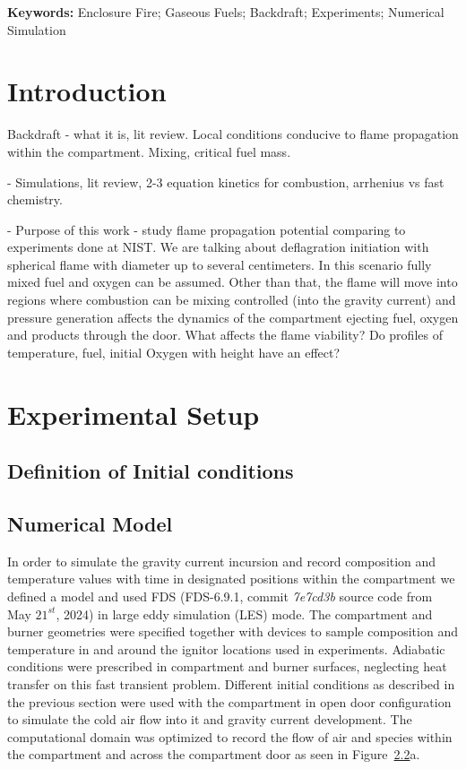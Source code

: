 \documentclass[12pt,letterpaper]{article}
\begin{document}
\begin{flushleft}
\textbf{Keywords:}
Enclosure Fire; Gaseous Fuels; Backdraft; Experiments; Numerical Simulation

\section{Introduction} \addvspace{10pt}
\label{sec:introduction}

Backdraft - what it is, lit review. Local conditions conducive to flame propagation within the compartment. Mixing, critical fuel mass.

- Simulations, lit review, 2-3 equation kinetics for combustion, arrhenius vs fast chemistry.

- Purpose of this work - study flame propagation potential comparing to experiments done at NIST. We are talking about deflagration initiation with spherical flame with diameter up to several centimeters. In this scenario fully mixed fuel and oxygen can be assumed. Other than that, the flame will move into regions where combustion can be mixing controlled (into the gravity current) and pressure generation affects the dynamics of the compartment ejecting fuel, oxygen and products through the door. What affects the flame viability? Do profiles of temperature, fuel, initial Oxygen with height have an effect? 

\section{Experimental Setup} \addvspace{10pt}
\label{sec:expsetup}

\subsection{Definition of Initial conditions} \addvspace{10pt}
\label{sec:initcond}


\subsection{Numerical Model} \addvspace{10pt}
\label{sec:nummodel}

In order to simulate the gravity current incursion and record composition and temperature values with time in designated positions within the compartment we defined a model and used FDS (FDS-6.9.1, commit \textit{7e7cd3b} source code from May $21^{st}$, 2024) in large eddy simulation (LES) mode. The compartment and burner geometries were specified together with devices to sample composition and temperature in and around the ignitor locations used in experiments. Adiabatic conditions were prescribed in compartment and burner surfaces, neglecting heat transfer on this fast transient problem. Different initial conditions as described in the previous section were used with the compartment in open door configuration to simulate the cold air flow into it and gravity current development. The computational domain was optimized to record the flow of air and species within the compartment and across the compartment door as seen in Figure~\ref{}a. 



\end{flushleft}
\end{document}
